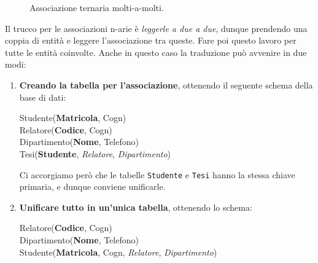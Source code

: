 \documentclass[12pt]{report}
\begin{document}
\begin{figure}[htbp]
{%
		}
		\caption{Associazione ternaria molti-a-molti.}
	\end{figure}
	
	Il trucco per le associazioni n-arie è \textit{leggerle a due a due}, dunque prendendo una coppia di entità e leggere l'associazione tra queste. Fare poi questo lavoro per tutte le entità coinvolte.
	Anche in questo caso la traduzione può avvenire in due modi:
	\begin{enumerate}
		\item \textbf{Creando la tabella per l'associazione}, ottenendo il seguente schema della base di dati:
		\begin{center}
			Studente(\textbf{Matricola}, Cogn)\\
			Relatore(\textbf{Codice}, Cogn)\\
			Dipartimento(\textbf{Nome}, Telefono)\\
			Tesi(\textbf{Studente}, \textit{Relatore}, \textit{Dipartimento})
		\end{center}
		Ci accorgiamo però che le tabelle \texttt{Studente} e \texttt{Tesi} hanno la stessa chiave primaria, e dunque conviene unificarle.
		
		\item \textbf{Unificare tutto in un'unica tabella}, ottenendo lo schema:
		\begin{center}
			Relatore(\textbf{Codice}, Cogn)\\
			Dipartimento(\textbf{Nome}, Telefono)\\
			Studente(\textbf{Matricola}, Cogn, \textit{Relatore}, \textit{Dipartimento})
		\end{center}
	\end{enumerate}
	
\end{document}
